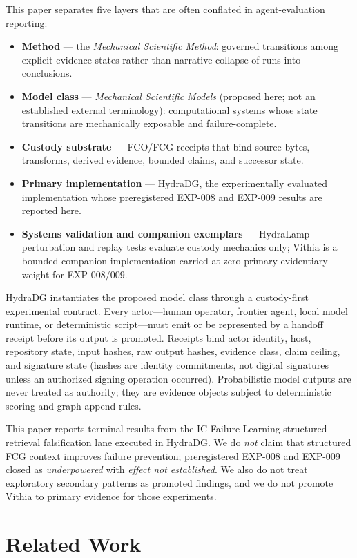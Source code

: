 \documentclass{article}
\begin{document}
This paper separates five layers that are often conflated in agent-evaluation reporting:
\begin{itemize}
  \item \textbf{Method} --- the \emph{Mechanical Scientific Method}: governed transitions among explicit evidence states rather than narrative collapse of runs into conclusions.
  \item \textbf{Model class} --- \emph{Mechanical Scientific Models} (proposed here; not an established external terminology): computational systems whose state transitions are mechanically exposable and failure-complete.
  \item \textbf{Custody substrate} --- FCO/FCG receipts that bind source bytes, transforms, derived evidence, bounded claims, and successor state.
  \item \textbf{Primary implementation} --- HydraDG, the experimentally evaluated implementation whose preregistered EXP-008 and EXP-009 results are reported here.
  \item \textbf{Systems validation and companion exemplars} --- HydraLamp perturbation and replay tests evaluate custody mechanics only; Vithia is a bounded companion implementation carried at zero primary evidentiary weight for EXP-008/009.
\end{itemize}

HydraDG instantiates the proposed model class through a custody-first experimental contract.
Every actor---human operator, frontier agent, local model runtime, or deterministic script---must emit or be represented by a handoff receipt before its output is promoted.
Receipts bind actor identity, host, repository state, input hashes, raw output hashes, evidence class, claim ceiling, and signature state (hashes are identity commitments, not digital signatures unless an authorized signing operation occurred).
Probabilistic model outputs are never treated as authority; they are evidence objects subject to deterministic scoring and graph append rules.

This paper reports terminal results from the IC Failure Learning structured-retrieval falsification lane executed in HydraDG.
We do \emph{not} claim that structured FCG context improves failure prevention; preregistered EXP-008 and EXP-009 closed as \emph{underpowered} with \emph{effect not established}.
We also do not treat exploratory secondary patterns as promoted findings, and we do not promote Vithia to primary evidence for those experiments.

\section{Related Work}
\end{document}
